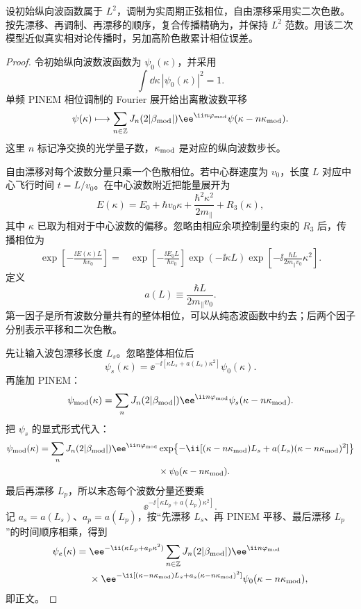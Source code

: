 \begin{proposition}[相位调制与二次漂移的幺正复合]
设初始纵向波函数属于 $L^2$，调制为实周期正弦相位，自由漂移采用实二次色散。按先漂移、再调制、再漂移的顺序，复合传播精确为，并保持 $L^2$ 范数。用该二次模型近似真实相对论传播时，另加高阶色散累计相位误差。
\end{proposition}
\begin{proof}
令初始纵向波数波函数为 $\psi_0(\kappa)$，并采用
\[
\int\dd\kappa\,|\psi_0(\kappa)|^2=1.
\]
单频 PINEM 相位调制的 Fourier 展开给出离散波数平移
\[
\psi(\kappa)
\longmapsto
\sum_{n\in\mathbb Z}
J_n(2|\beta_{\rm mod}|)
\ee^{\ii n\varphi_{\rm mod}}
\psi(\kappa-n\kappa_{\rm mod}).
\]
这里 $n$ 标记净交换的光学量子数，$\kappa_{\rm mod}$ 是对应的纵向波数步长。

自由漂移对每个波数分量只乘一个色散相位。若中心群速度为 $v_0$，长度 $L$ 对应中心飞行时间
$t=L/v_0$。在中心波数附近把能量展开为
\[
E(\kappa)
=E_0+\hbar v_0\kappa
+\frac{\hbar^2\kappa^2}{2m_\parallel}+R_3(\kappa),
\]
其中 $\kappa$ 已取为相对于中心波数的偏移。忽略由相应余项控制量约束的 $R_3$ 后，传播相位为
\begin{align*}
\exp\!\left[-\frac{\ii E(\kappa)L}{\hbar v_0}\right]
={}&\exp\!\left[-\frac{\ii E_0L}{\hbar v_0}\right]
\exp(-\ii\kappa L)
\exp\!\left[-\ii\frac{\hbar L}{2m_\parallel v_0}\kappa^2\right].
\end{align*}
定义
\[
a(L)\equiv\frac{\hbar L}{2m_\parallel v_0}.
\]
第一因子是所有波数分量共有的整体相位，可以从纯态波函数中约去；后两个因子分别表示平移和二次色散。

先让输入波包漂移长度 $L_s$。忽略整体相位后
\[
\psi_s(\kappa)
=\ee^{-\ii[\kappa L_s+a(L_s)\kappa^2]}\psi_0(\kappa).
\]
再施加 PINEM：
\begin{align*}
\psi_{\rm mod}(\kappa)
=\sum_nJ_n(2|\beta_{\rm mod}|)
\ee^{\ii n\varphi_{\rm mod}}
\psi_s(\kappa-n\kappa_{\rm mod}).
\end{align*}
把 $\psi_s$ 的显式形式代入：
\begin{align*}
\psi_{\rm mod}(\kappa)
=\sum_nJ_n(2|\beta_{\rm mod}|)
\ee^{\ii n\varphi_{\rm mod}}
&\exp\!\left\{-\ii[(\kappa-n\kappa_{\rm mod})L_s
+a(L_s)(\kappa-n\kappa_{\rm mod})^2]\right\}\\
&\times\psi_0(\kappa-n\kappa_{\rm mod}).
\end{align*}
最后再漂移 $L_p$，所以末态每个波数分量还要乘
\[
\ee^{-\ii[\kappa L_p+a(L_p)\kappa^2]}.
\]
记 $a_s=a(L_s)$、$a_p=a(L_p)$，按“先漂移 $L_s$、再 PINEM 平移、最后漂移 $L_p$”的时间顺序相乘，得到
\[
\begin{aligned}
\psi_e(\kappa)={}&
\ee^{-\ii(\kappa L_p+a_p\kappa^2)}
\sum_{n\in\mathbb Z}
J_n(2|\beta_{\rm mod}|)\ee^{\ii n\varphi_{\rm mod}}\\
&\times
\ee^{-\ii[(\kappa-n\kappa_{\rm mod})L_s
+a_s(\kappa-n\kappa_{\rm mod})^2]}
\psi_0(\kappa-n\kappa_{\rm mod}),
\end{aligned}
\]
即正文。
\end{proof}


